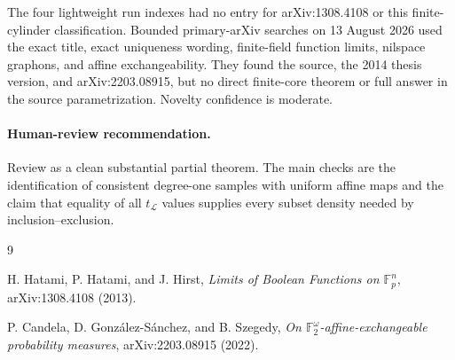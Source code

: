 \documentclass[11pt]{article}
\begin{document}
The four lightweight run indexes had no entry for arXiv:1308.4108 or this
finite-cylinder classification.  Bounded primary-arXiv searches on 13 August
2026 used the exact title, exact uniqueness wording, finite-field function
limits, nilspace graphons, and affine exchangeability.  They found the source,
the 2014 thesis version, and arXiv:2203.08915, but no direct finite-core theorem
or full answer in the source parametrization.  Novelty confidence is moderate.

\paragraph{Human-review recommendation.}
Review as a clean substantial partial theorem.  The main checks are the
identification of consistent degree-one samples with uniform affine maps and
the claim that equality of all $t_{\mathcal L}$ values supplies every subset
density needed by inclusion--exclusion.

\begin{thebibliography}{9}
\raggedright H. Hatami, P. Hatami, and J. Hirst,
\emph{Limits of Boolean Functions on $\mathbb F_p^n$},
arXiv:1308.4108 (2013).\par

\raggedright P. Candela, D. Gonz\'alez-S\'anchez, and B. Szegedy,
\emph{On $\mathbb F_2^\omega$-affine-exchangeable probability measures},
arXiv:2203.08915 (2022).\par
\end{thebibliography}
\end{document}
